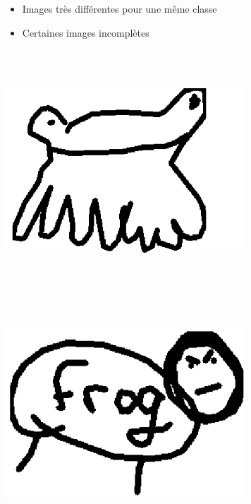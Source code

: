 \begin{center}
\end{center}




\vspace{4mm}




\centering
\begin{itemize}
\item Images très différentes pour une même classe
\item Certaines images incomplètes
\end{itemize}

\vspace{4mm}
\begin{center}
\includegraphics[width=9cm,height=9cm,keepaspectratio]{figures/frog_draw_1.png}
\includegraphics[width=9cm,height=9cm,keepaspectratio]{figures/frog_draw_2.png}

\end{center}
